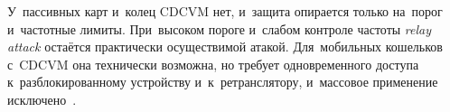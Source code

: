 У~пассивных карт и~колец CDCVM нет, и~защита опирается только на~порог
и~частотные лимиты. При~высоком пороге и~слабом контроле частоты
\textit{relay attack} остаётся практически осуществимой атакой. Для~мобильных кошельков
с~CDCVM она технически возможна, но требует одновременного
доступа к~разблокированному устройству и~к~ретранслятору, и~массовое
применение исключено~\cite{francis-practical-relay-attack}.
